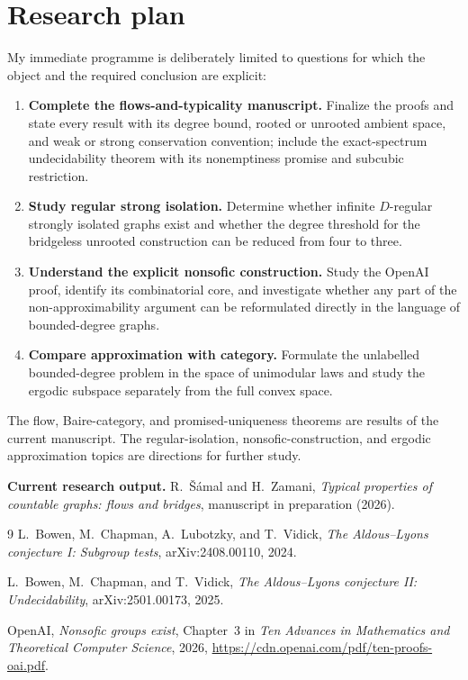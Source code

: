 \documentclass[10pt]{article}
\begin{document}
\section{Research plan}

My immediate programme is deliberately limited to questions for which the object and
the required conclusion are explicit:
\begin{enumerate}
\item \textbf{Complete the flows-and-typicality manuscript.}  Finalize the proofs and
      state every result with its degree bound, rooted or unrooted ambient space, and
      weak or strong conservation convention; include the exact-spectrum
      undecidability theorem with its nonemptiness promise and subcubic restriction.
\item \textbf{Study regular strong isolation.}  Determine whether infinite
      $D$-regular strongly isolated graphs exist and whether the degree threshold for
      the bridgeless unrooted construction can be reduced from four to three.
\item \textbf{Understand the explicit nonsofic construction.}  Study the OpenAI
      proof, identify its combinatorial core, and investigate whether any part of the
      non-approximability argument can be reformulated directly in the language of
      bounded-degree graphs.
\item \textbf{Compare approximation with category.}  Formulate the unlabelled
      bounded-degree problem in the space of unimodular laws and study the ergodic
      subspace separately from the full convex space.
\end{enumerate}

The flow, Baire-category, and promised-uniqueness theorems are results of the current
manuscript.  The regular-isolation, nonsofic-construction, and ergodic approximation
topics are directions for further study.

\textbf{Current research output.}
R.~\v{S}\'amal and H.~Zamani,
\emph{Typical properties of countable graphs: flows and bridges}, manuscript in
preparation (2026).

\renewcommand{\refname}{Selected references}
\begin{thebibliography}{9}
\footnotesize
\setlength{\itemsep}{0pt}
\setlength{\parskip}{0pt}
L.~Bowen, M.~Chapman, A.~Lubotzky, and T.~Vidick,
\emph{The Aldous--Lyons conjecture I: Subgroup tests},
arXiv:2408.00110, 2024.

L.~Bowen, M.~Chapman, and T.~Vidick,
\emph{The Aldous--Lyons conjecture II: Undecidability},
arXiv:2501.00173, 2025.

OpenAI, \emph{Nonsofic groups exist}, Chapter~3 in
\emph{Ten Advances in Mathematics and Theoretical Computer Science}, 2026,
\url{https://cdn.openai.com/pdf/ten-proofs-oai.pdf}.
\end{thebibliography}
\end{document}
